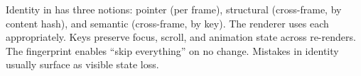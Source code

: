 \begin{recap}
Identity in \maya{} has three notions: pointer (per frame),
structural (cross-frame, by content hash), and semantic
(cross-frame, by key). The renderer uses each appropriately.
Keys preserve focus, scroll, and animation state across
re-renders. The fingerprint enables ``skip everything'' on no
change. Mistakes in identity usually surface as visible state
loss.
\end{recap}
